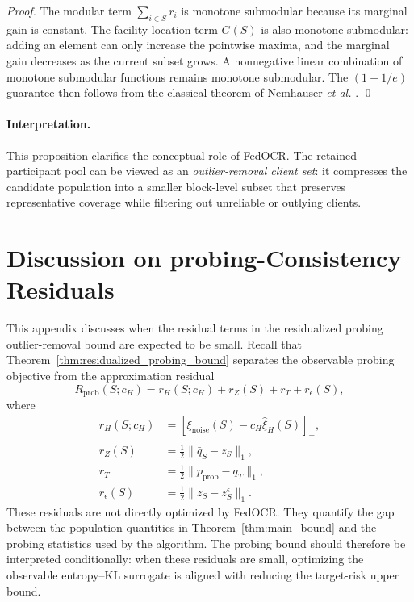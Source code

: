 \begin{proof}
The modular term $\sum_{i\in S}r_i$ is monotone submodular because its marginal gain is constant. The facility-location term $G(S)$ is also monotone submodular: adding an element can only increase the pointwise maxima, and the marginal gain decreases as the current subset grows. A nonnegative linear combination of monotone submodular functions remains monotone submodular. The $(1-1/e)$ guarantee then follows from the classical theorem of Nemhauser \emph{et al.} \cite{nemhauser1978submodular}. \qed
\end{proof}

\paragraph{\textbf{Interpretation.}}
This proposition clarifies the conceptual role of FedOCR. The retained participant pool can be viewed as an \emph{outlier-removal client set}: it compresses the candidate population into a smaller block-level subset that preserves representative coverage while filtering out unreliable or outlying clients.

\section{Discussion on probing-Consistency Residuals}
\label{app:probing_consistency}

This appendix discusses when the residual terms in the residualized probing outlier-removal bound are expected to be small.
Recall that Theorem~\ref{thm:residualized_probing_bound} separates the observable probing objective from the approximation residual
\[
R_{\mathrm{prob}}(S;c_H)
=
r_H(S;c_H)
+
r_Z(S)
+
r_T
+
r_\epsilon(S),
\]
where
\[
\begin{aligned}
r_H(S;c_H)
&=
\left[
\xi_{\mathrm{noise}}(S)
-
c_H\widehat{\xi}_{H}(S)
\right]_+,
\\
r_Z(S)
&=
\frac12\|\bar q_S-z_S\|_1,
\\
r_T
&=
\frac12\|p_{\mathrm{prob}}-q_T\|_1,
\\
r_\epsilon(S)
&=
\frac12\|z_S-z_S^\epsilon\|_1.
\end{aligned}
\]
These residuals are not directly optimized by FedOCR.
They quantify the gap between the population quantities in Theorem~\ref{thm:main_bound} and the probing statistics used by the algorithm.
The probing bound should therefore be interpreted conditionally: when these residuals are small, optimizing the observable entropy--KL surrogate is aligned with reducing the target-risk upper bound.

